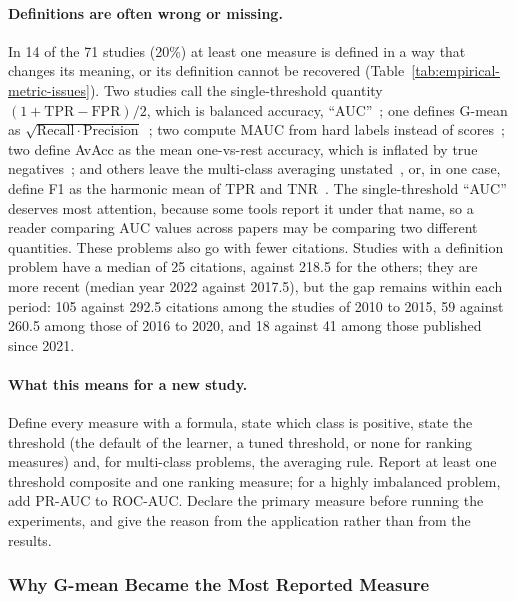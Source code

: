 \paragraph{Definitions are often wrong or missing.} In 14 of the 71 studies (20\%) at least one measure is defined in a way that changes its meaning, or its definition cannot be recovered (Table~\ref{tab:empirical-metric-issues}). Two studies call the single-threshold quantity $(1 + \mathrm{TPR} - \mathrm{FPR})/2$, which is balanced accuracy, ``AUC''~\parencite{datta2020dlexiboost,xie2022gdo}; one defines G-mean as $\sqrt{\mathrm{Recall} \cdot \mathrm{Precision}}$~\parencite{liu2020spe}; two compute MAUC from hard labels instead of scores~\parencite{zheng2022shsampler,yan2025gdhs}; two define AvAcc as the mean one-vs-rest accuracy, which is inflated by true negatives~\parencite{ma2024mcmbrc,tao2025mcnclwo}; and others leave the multi-class averaging unstated~\parencite{agrawal2015scut,palli2022cbhsid}, or, in one case, define F1 as the harmonic mean of TPR and TNR~\parencite{palli2022cbhsid}. The single-threshold ``AUC'' deserves most attention, because some tools report it under that name, so a reader comparing AUC values across papers may be comparing two different quantities. These problems also go with fewer citations. Studies with a definition problem have a median of 25 citations, against 218.5 for the others; they are more recent (median year 2022 against 2017.5), but the gap remains within each period: 105 against 292.5 citations among the studies of 2010 to 2015, 59 against 260.5 among those of 2016 to 2020, and 18 against 41 among those published since 2021.



\paragraph{What this means for a new study.} Define every measure with a formula, state which class is positive, state the threshold (the default of the learner, a tuned threshold, or none for ranking measures) and, for multi-class problems, the averaging rule. Report at least one threshold composite and one ranking measure; for a highly imbalanced problem, add PR-AUC to ROC-AUC. Declare the primary measure before running the experiments, and give the reason from the application rather than from the results.

\subsubsection{Why G-mean Became the Most Reported Measure}
\label{sec:empirical-gmean}

